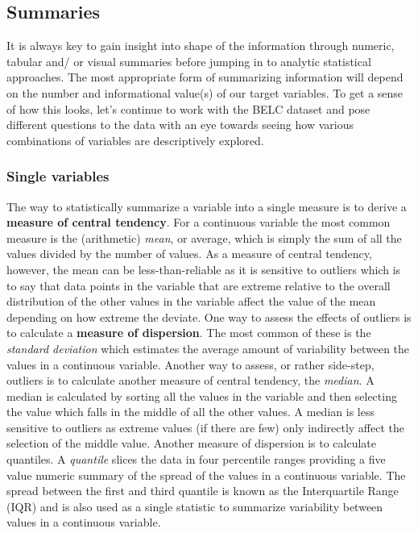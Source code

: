 \documentclass[
  letterpaper,
]{scrbook}
\begin{document}
\hypertarget{summaries}{%
\subsection{Summaries}\label{summaries}}

It is always key to gain insight into shape of the information through
numeric, tabular and/ or visual summaries before jumping in to analytic
statistical approaches. The most appropriate form of summarizing
information will depend on the number and informational value(s) of our
target variables. To get a sense of how this looks, let's continue to
work with the BELC dataset and pose different questions to the data with
an eye towards seeing how various combinations of variables are
descriptively explored.

\hypertarget{single-variables}{%
\subsubsection{Single variables}\label{single-variables}}

The way to statistically summarize a variable into a single measure is
to derive a \textbf{measure of central tendency}. For a continuous
variable the most common measure is the (arithmetic) \emph{mean}, or
average, which is simply the sum of all the values divided by the number
of values. As a measure of central tendency, however, the mean can be
less-than-reliable as it is sensitive to outliers which is to say that
data points in the variable that are extreme relative to the overall
distribution of the other values in the variable affect the value of the
mean depending on how extreme the deviate. One way to assess the effects
of outliers is to calculate a \textbf{measure of dispersion}. The most
common of these is the \emph{standard deviation} which estimates the
average amount of variability between the values in a continuous
variable. Another way to assess, or rather side-step, outliers is to
calculate another measure of central tendency, the \emph{median}. A
median is calculated by sorting all the values in the variable and then
selecting the value which falls in the middle of all the other values. A
median is less sensitive to outliers as extreme values (if there are
few) only indirectly affect the selection of the middle value. Another
measure of dispersion is to calculate quantiles. A \emph{quantile}
slices the data in four percentile ranges providing a five value numeric
summary of the spread of the values in a continuous variable. The spread
between the first and third quantile is known as the Interquartile Range
(IQR) and is also used as a single statistic to summarize variability
between values in a continuous variable.
\end{document}
